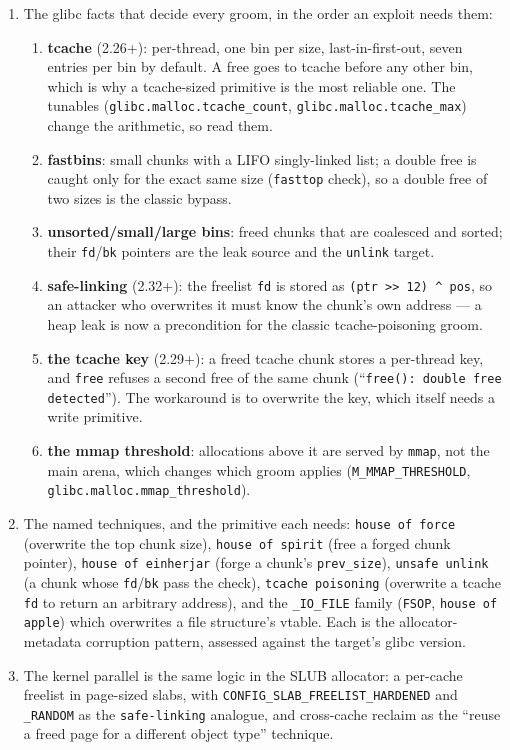 \documentclass[12pt]{Training}
\begin{document}
\begin{enumerate}
    \item The glibc facts that decide every groom, in the order an exploit needs them:
    \begin{enumerate}
        \item \textbf{tcache} (2.26+): per-thread, one bin per size, last-in-first-out, seven entries per bin by default. A free goes to tcache before any other bin, which is why a tcache-sized primitive is the most reliable one. The tunables (\lstinline{glibc.malloc.tcache_count}, \lstinline{glibc.malloc.tcache_max}) change the arithmetic, so read them.
        \item \textbf{fastbins}: small chunks with a LIFO singly-linked list; a double free is caught only for the exact same size (\lstinline{fasttop} check), so a double free of two sizes is the classic bypass.
        \item \textbf{unsorted/small/large bins}: freed chunks that are coalesced and sorted; their \lstinline{fd}/\lstinline{bk} pointers are the leak source and the \lstinline{unlink} target.
        \item \textbf{safe-linking} (2.32+): the freelist \lstinline{fd} is stored as \lstinline{(ptr >> 12) ^ pos}, so an attacker who overwrites it must know the chunk's own address --- a heap leak is now a precondition for the classic tcache-poisoning groom.
        \item \textbf{the tcache key} (2.29+): a freed tcache chunk stores a per-thread key, and \lstinline{free} refuses a second free of the same chunk (``\lstinline{free(): double free detected}''). The workaround is to overwrite the key, which itself needs a write primitive.
        \item \textbf{the mmap threshold}: allocations above it are served by \lstinline{mmap}, not the main arena, which changes which groom applies (\lstinline{M_MMAP_THRESHOLD}, \lstinline{glibc.malloc.mmap_threshold}).
    \end{enumerate}
    \item The named techniques, and the primitive each needs: \lstinline{house of force} (overwrite the top chunk size), \lstinline{house of spirit} (free a forged chunk pointer), \lstinline{house of einherjar} (forge a chunk's \lstinline{prev_size}), \lstinline{unsafe unlink} (a chunk whose \lstinline{fd}/\lstinline{bk} pass the check), \lstinline{tcache poisoning} (overwrite a tcache \lstinline{fd} to return an arbitrary address), and the \lstinline{_IO_FILE} family (\lstinline{FSOP}, \lstinline{house of apple}) which overwrites a file structure's vtable. Each is the allocator-metadata corruption pattern, assessed against the target's glibc version.
    \item The kernel parallel is the same logic in the SLUB allocator: a per-cache freelist in page-sized slabs, with \lstinline{CONFIG_SLAB_FREELIST_HARDENED} and \lstinline{_RANDOM} as the \lstinline{safe-linking} analogue, and cross-cache reclaim as the ``reuse a freed page for a different object type'' technique.
\end{enumerate}
\end{document}
